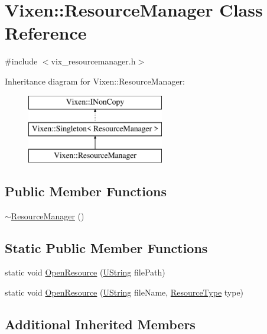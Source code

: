 \hypertarget{classVixen_1_1ResourceManager}{}\section{Vixen\+:\+:Resource\+Manager Class Reference}
\label{classVixen_1_1ResourceManager}


{\ttfamily \#include $<$vix\+\_\+resourcemanager.\+h$>$}

Inheritance diagram for Vixen\+:\+:Resource\+Manager\+:\begin{figure}[H]
\begin{center}
\leavevmode
\includegraphics[height=3.000000cm]{classVixen_1_1ResourceManager}
\end{center}
\end{figure}
\subsection*{Public Member Functions}
\begin{DoxyCompactItemize}
\item 
\hyperlink{classVixen_1_1ResourceManager_a6b643c243582cdb8eab38e48cf6fa8cf}{$\sim$\+Resource\+Manager} ()
\end{DoxyCompactItemize}
\subsection*{Static Public Member Functions}
\begin{DoxyCompactItemize}
\item 
static void \hyperlink{classVixen_1_1ResourceManager_a3ca204897da35df704300c937e00c967}{Open\+Resource} (\hyperlink{vix__stringutil_8h_a561c282c415a5c38fd9a26325701e3bf}{U\+String} file\+Path)
\item 
static void \hyperlink{classVixen_1_1ResourceManager_a407b9c3d2700761287127de4d86b722e}{Open\+Resource} (\hyperlink{vix__stringutil_8h_a561c282c415a5c38fd9a26325701e3bf}{U\+String} file\+Name, \hyperlink{namespaceVixen_a0ddb8e6066715322f5a48e9b2beb2461}{Resource\+Type} type)
\end{DoxyCompactItemize}
\subsection*{Additional Inherited Members}


